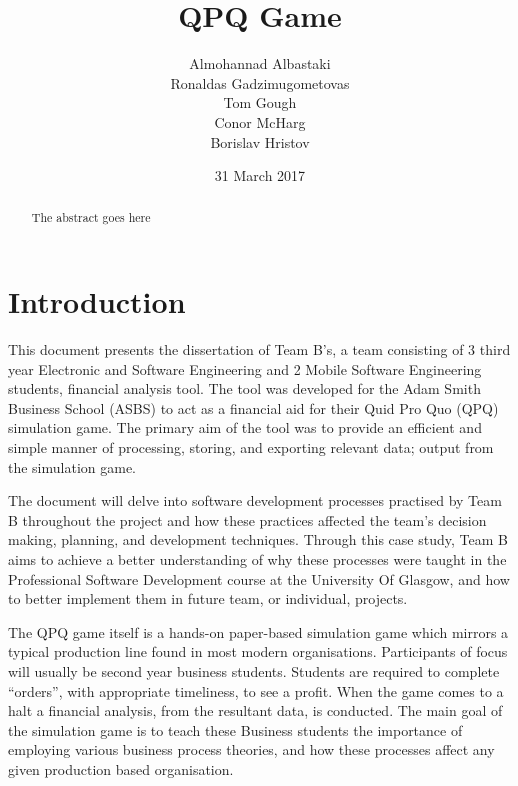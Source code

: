 \documentclass{l3proj}
\begin{document}
\title{QPQ Game}

\author{Almohannad Albastaki \\
        Ronaldas Gadzimugometovas \\
        Tom Gough \\
     	Conor McHarg \\
        Borislav Hristov}

\date{31 March 2017}

\maketitle

\begin{abstract}

The abstract goes here

\end{abstract}

\educationalconsent

\newpage

\section{Introduction}
\label{sec:introduction}

This document presents the dissertation of Team B’s, a team consisting of 3 third year Electronic and Software Engineering and 2 Mobile Software Engineering students, financial analysis tool. The tool was developed for the Adam Smith Business School (ASBS) to act as a financial aid for their Quid Pro Quo (QPQ) simulation game. The primary aim of the tool was to provide an efficient and simple manner of processing, storing, and exporting relevant data; output from the simulation game.

    The document will delve into software development processes practised by Team B throughout the project and how these practices affected the team’s decision making, planning, and development techniques. Through this case study, Team B aims to achieve a better understanding of why these processes were taught in the Professional Software Development course at the University Of Glasgow, and how to better implement them in future team, or individual, projects.

    The QPQ game itself is a hands-on paper-based simulation game which mirrors a typical production line found in most modern organisations. Participants of focus will usually be second year business students. Students are required to complete “orders”, with appropriate timeliness, to see a profit. When the game comes to a halt a financial analysis, from the resultant data, is conducted. The main goal of the simulation game is to teach these Business students the importance of employing various business process theories, and how these processes affect any given production based organisation.  
\end{document}
